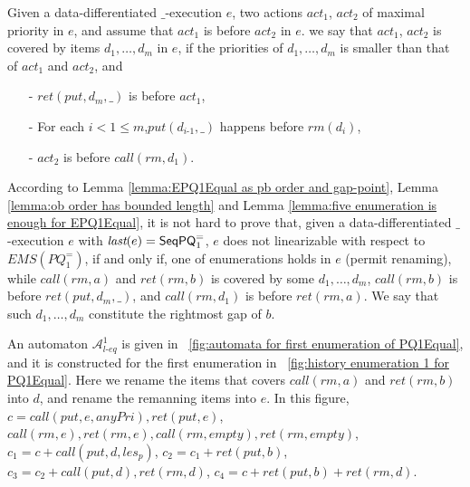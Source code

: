 Given a data-differentiated $\_$-execution $e$, two actions $\textit{act}_1$, $\textit{act}_2$ of maximal priority in $e$, and assume that $\textit{act}_1$ is before $\textit{act}_2$ in $e$.
we say that $\textit{act}_1$, $\textit{act}_2$ is covered by items $d_1,\ldots,d_m$ in $e$, if the priorities of $d_1,\ldots,d_m$ is smaller than that of $\textit{act}_1$ and $\textit{act}_2$, and

\begin{itemize}
\setlength{\itemsep}{0.5pt}
\item[-] $\textit{ret}(\textit{put},d_m,\_)$ is before $\textit{act}_1$,

\item[-] For each $i < 1 \leq m$,$\textit{put}(d_{\textit{i-1}},\_)$ happens before $\textit{rm}(d_i)$,

\item[-] $\textit{act}_2$ is before $\textit{call}(\textit{rm},d_1)$.
\end{itemize}

According to Lemma \ref{lemma:EPQ1Equal as pb order and gap-point}, Lemma \ref{lemma:ob order has bounded length} and Lemma \ref{lemma:five enumeration is enough for EPQ1Equal}, it is not hard to prove that, given a data-differentiated $\_$-execution $e$ with $\textit{last}(e) = \mathsf{SeqPQ}_1^{=}$, $e$ does not linearizable with respect to $\textit{EMS}(\textit{PQ}_1^{=})$, if and only if, one of enumerations holds in $e$ (permit renaming), while $\textit{call}(\textit{rm},a)$ and $\textit{ret}(\textit{rm},b)$ is covered by some $d_1,\ldots,d_m$, $\textit{call}(\textit{rm},b)$ is before $\textit{ret}(\textit{put},d_m,\_)$, and $\textit{call}(\textit{rm},d_1)$ is before $\textit{ret}(\textit{rm},a)$. We say that such $d_1,\ldots,d_m$ constitute the rightmost gap of $b$.


An automaton $\mathcal{A}_{\textit{l-eq}}^1$ is given in \figurename~\ref{fig:automata for first enumeration of PQ1Equal}, and it is constructed for the first enumeration in \figurename~\ref{fig:history enumeration 1 for PQ1Equal}. Here we rename the items that covers $\textit{call}(\textit{rm},a)$ and $\textit{ret}(\textit{rm},b)$ into $d$, and rename the remanning items into $e$. In this figure, $c = \textit{call}(\textit{put},e,\textit{anyPri}),\textit{ret}(\textit{put},e)$, $\textit{call}(\textit{rm},e), \textit{ret}(\textit{rm},e),\textit{call}(\textit{rm},\textit{empty}),\textit{ret}(\textit{rm},\textit{empty})$, $c_1 = c + \textit{call}(\textit{put},d,\textit{les}_p)$, $c_2 = c_1 + \textit{ret}(\textit{put},b)$, $c_3 = c_2 + \textit{call}(\textit{put},d),\textit{ret}(\textit{rm},d)$, $c_4 = c + \textit{ret}(\textit{put},b) + \textit{ret}(\textit{rm},d)$.

